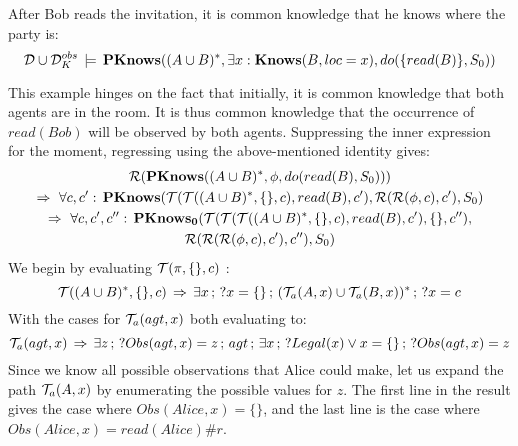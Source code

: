 \begin{example}
After Bob reads the invitation, it is common knowledge that he knows
where the party is:\[
\mathcal{D}\cup\mathcal{D}_{K}^{obs}\,\models\,\mathbf{PKnows}((A\cup B)^{*},\exists x:\mathbf{Knows}(B,loc=x),do(\{read(B)\},S_{0}))\]

\end{example}
This example hinges on the fact that initially, it is common knowledge
that both agents are in the room. It is thus common knowledge that
the occurrence of $read(Bob)$ will be observed by both agents. Suppressing
the inner expression for the moment, regressing using the above-mentioned
identity gives:\begin{multline*}
\mathcal{R}(\mathbf{PKnows}((A\cup B)^{*},\phi,do(read(B),S_{0})))\\
\Rightarrow\,\,\forall c,c':\,\mathbf{PKnows}(\mathcal{T}(\mathcal{T}((A\cup B)^{*},\{\},c),read(B),c'),\mathcal{R}(\mathcal{R}(\phi,c),c'),S_{0})\\
\Rightarrow\,\,\forall c,c',c'':\,\mathbf{PKnows_{0}}(\mathcal{T}(\mathcal{T}(\mathcal{T}((A\cup B)^{*},\{\},c),read(B),c'),\{\},c''),\\
\mathcal{R}(\mathcal{R}(\mathcal{R}(\phi,c),c'),c''),S_{0})\end{multline*}
 We begin by evaluating $\mathcal{T}(\pi,\{\},c)$ :\[
\mathcal{T}((A\cup B)^{*},\{\},c)\,\Rightarrow\,\exists x\,;\,?x=\{\}\,;\,(\mathcal{T}_{a}(A,x)\cup\mathcal{T}_{a}(B,x))^{*}\,;\,?x=c\]
 With the cases for $\mathcal{T}_{a}(agt,x)$ both evaluating to:\[
\mathcal{T}_{a}(agt,x)\,\Rightarrow\,\exists z\,;\,?Obs(agt,x)=z\,;\, agt\,;\,\exists x\,;\,?Legal(x)\vee x=\{\}\,;\,?Obs(agt,x)=z\]
 Since we know all possible observations that Alice could make, let
us expand the path $\mathcal{T}_{a}(A,x)$ by enumerating the possible values
for $z$. The first line in the result gives the case where $Obs(Alice,x)=\{\}$,
and the last line is the case where $Obs(Alice,x)=read(Alice)\#r$.
